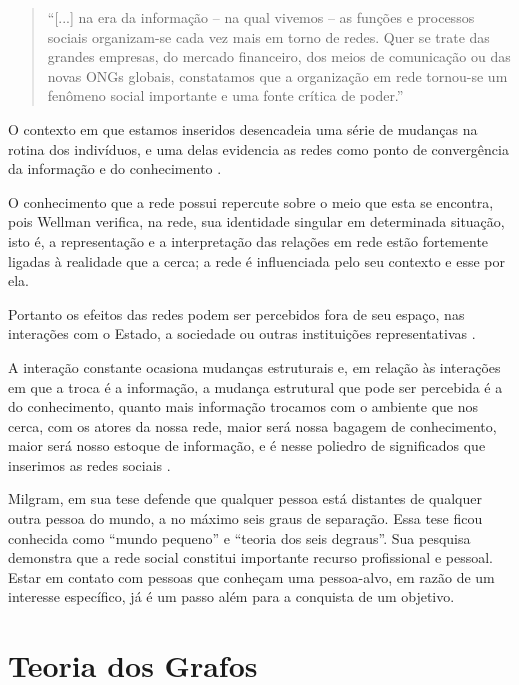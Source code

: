 \begin{quote}
	``[...] na era da informação – na qual vivemos – as
	funções e processos sociais organizam-se cada vez
	mais em torno de redes. Quer se trate das grandes
	empresas, do mercado financeiro, dos meios de
	comunicação ou das novas ONGs globais,
	constatamos que a organização em rede tornou-se
	um fenômeno social importante e uma fonte crítica
	de poder.'' \cite{Capra:2002}
\end{quote}

O contexto em que estamos inseridos desencadeia uma série de mudanças na rotina dos indivíduos, e uma delas evidencia as redes como ponto de convergência da informação e do conhecimento \cite{Tomae:Alcara:Chiara:2005}.

O conhecimento que a rede possui repercute sobre o meio que esta se encontra, pois Wellman \cite{Wellman:1996} verifica, na rede, sua identidade singular em determinada situação, isto é, a representação e a interpretação das relações em rede estão fortemente ligadas à realidade que a cerca; a rede é influenciada pelo seu contexto e esse por ela.

Portanto os efeitos das redes podem ser percebidos fora de seu espaço, nas interações com o Estado, a sociedade ou outras instituições representativas \cite{Marteleto:2001}.

A interação constante ocasiona mudanças estruturais e, em relação às interações em que a troca é a informação, a mudança estrutural que pode ser percebida é a do conhecimento, quanto mais informação trocamos com o ambiente que nos cerca, com os atores da nossa rede, maior será nossa bagagem de conhecimento, maior será nosso estoque de informação, e é nesse poliedro de significados que inserimos as redes sociais \cite{Tomae:Alcara:Chiara:2005}.

Milgram, em sua tese \cite{Milgram:1967} defende que qualquer pessoa está distantes de qualquer outra pessoa do mundo, a no máximo seis graus de separação. Essa tese ficou conhecida como ``mundo pequeno'' e ``teoria dos seis degraus''. Sua pesquisa demonstra que a rede social constitui importante recurso profissional e pessoal. Estar em contato com pessoas que conheçam uma pessoa-alvo, em razão de um interesse específico, já é um passo além para a conquista de um objetivo.

\section{Teoria dos Grafos}

